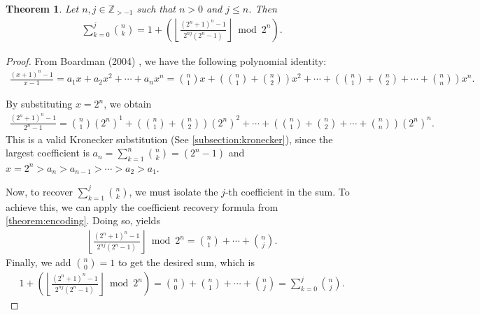 \documentclass[10pt,a4paper]{article}
\theoremstyle{plain}
\newtheorem{theorem}{Theorem}[section]
\newcommand{\floor}[1]{\left\lfloor #1 \right\rfloor}
\newcommand{\Z}{\mathbb{Z}}
\begin{document}
\begin{theorem} \label{proof:binomialcoeffpartialsums2}
Let $n,j \in \Z_{>-1}$ such that $n>0$ and $j \leq n$. Then
\begin{align*}
\sum_{k=0}^{j} \binom{n}{k} = 1 + \left( \floor{ \frac{(2^n+1)^n - 1}{2^{nj}(2^n-1)} } \bmod 2^n \right) .
\end{align*}
\end{theorem}
\begin{proof}
From Boardman (2004) \cite{boardman2004eggdropnumbers}, we have the following polynomial identity:
\begin{align*}
\frac{(x+1)^n - 1}{x-1} = 
a_1 x
+ a_2 x^2
+ \cdots
+ a_n x^n =
\binom{n}{1} x
+ \left( \binom{n}{1} + \binom{n}{2} \right) x^2
+ \cdots
+ \left( \binom{n}{1} + \binom{n}{2} + \cdots + \binom{n}{n} \right) x^n .
\end{align*}

By substituting $x=2^n$, we obtain
\begin{align*}
\frac{(2^n+1)^n - 1}{2^n-1} = 
\binom{n}{1} (2^n)^1
+ \left( \binom{n}{1} + \binom{n}{2} \right) (2^n)^2
+ \cdots
+ \left( \binom{n}{1} + \binom{n}{2} + \cdots + \binom{n}{n} \right) (2^n)^n .
\end{align*}
This is a valid Kronecker substitution (See \cref{subsection:kronecker}), since the largest coefficient is $a_n = \sum_{k=1}^n \binom{n}{k} = (2^n-1)$ and $x=2^n > a_n > a_{n-1} > \cdots > a_2 > a_1$.

Now, to recover $\sum_{k=1}^j \binom{n}{k}$, we must isolate the $j$-th coefficient in the sum. To achieve this, we can apply the coefficient recovery formula from \cref{theorem:encoding}. Doing so, yields
\begin{align*}
\floor{ \frac{(2^n+1)^n - 1}{2^{nj}(2^n-1)} } \bmod 2^n = 
\binom{n}{1} + \cdots + \binom{n}{j} .
\end{align*}
Finally, we add $\binom{n}{0} = 1$ to get the desired sum, which is
\begin{align*}
1 + \left( \floor{ \frac{(2^n+1)^n - 1}{2^{nj}(2^n-1)} } \bmod 2^n \right) = 
\binom{n}{0} + \binom{n}{1} + \cdots + \binom{n}{j} = \sum_{k=0}^j \binom{n}{j} .
\end{align*}
\end{proof}
\end{document}
